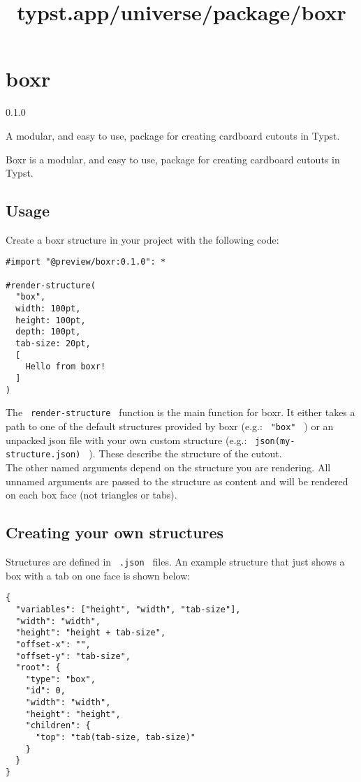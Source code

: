 \title{typst.app/universe/package/boxr}

\label{banner}
\section{boxr}\label{boxr}

{ 0.1.0 }

A modular, and easy to use, package for creating cardboard cutouts in
Typst.

\label{readme}
Boxr is a modular, and easy to use, package for creating cardboard
cutouts in Typst.

\subsection{Usage}\label{usage}

Create a boxr structure in your project with the following code:

\begin{verbatim}
#import "@preview/boxr:0.1.0": *

#render-structure(
  "box",
  width: 100pt,
  height: 100pt,
  depth: 100pt,
  tab-size: 20pt,
  [
    Hello from boxr!
  ]
)
\end{verbatim}

The \texttt{\ render-structure\ } function is the main function for
boxr. It either takes a path to one of the default structures provided
by boxr (e.g.: \texttt{\ "box"\ } ) or an unpacked json file with your
own custom structure (e.g.: \texttt{\ json(my-structure.json)\ } ).
These describe the structure of the cutout.\\
The other named arguments depend on the structure you are rendering. All
unnamed arguments are passed to the structure as content and will be
rendered on each box face (not triangles or tabs).

\subsection{Creating your own
structures}\label{creating-your-own-structures}

Structures are defined in \texttt{\ .json\ } files. An example structure
that just shows a box with a tab on one face is shown below:

\begin{verbatim}
{
  "variables": ["height", "width", "tab-size"],
  "width": "width",
  "height": "height + tab-size",
  "offset-x": "",
  "offset-y": "tab-size",
  "root": {
    "type": "box",
    "id": 0,
    "width": "width",
    "height": "height",
    "children": {
      "top": "tab(tab-size, tab-size)"
    }
  }
}
\end{verbatim}

